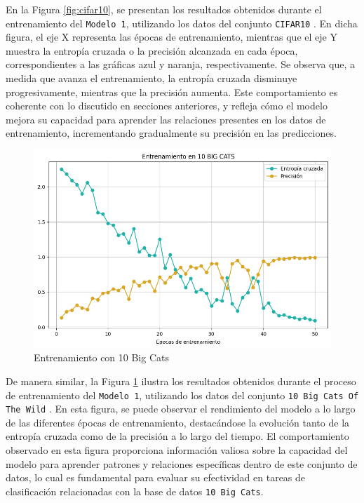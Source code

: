 En la Figura \ref{fig:cifar10}, se presentan los resultados obtenidos durante el entrenamiento del \texttt{Modelo 1}, utilizando los datos del conjunto \texttt{CIFAR10} \cite{cifar10}. En dicha figura, el eje X representa las épocas de entrenamiento, mientras que el eje Y muestra la entropía cruzada o la precisión alcanzada en cada época, correspondientes a las gráficas azul y naranja, respectivamente. Se observa que, a medida que avanza el entrenamiento, la entropía cruzada disminuye progresivamente, mientras que la precisión aumenta. Este comportamiento es coherente con lo discutido en secciones anteriores, y refleja cómo el modelo mejora su capacidad para aprender las relaciones presentes en los datos de entrenamiento, incrementando gradualmente su precisión en las predicciones. 

\begin{figure}[H]
	\centering
	\includegraphics[scale=0.5]{imagenes/10_big_cats.png}  
	\caption{Entrenamiento con 10 Big Cats}
	\label{fig:10_big_cats}
\end{figure}

De manera similar, la Figura \ref{fig:10_big_cats} ilustra los resultados obtenidos durante el proceso de entrenamiento del \texttt{Modelo 1}, utilizando los datos del conjunto \texttt{10 Big Cats Of The Wild} \cite{10_big_cats}. En esta figura, se puede observar el rendimiento del modelo a lo largo de las diferentes épocas de entrenamiento, destacándose la evolución tanto de la entropía cruzada como de la precisión a lo largo del tiempo. El comportamiento observado en esta figura proporciona información valiosa sobre la capacidad del modelo para aprender patrones y relaciones específicas dentro de este conjunto de datos, lo cual es fundamental para evaluar su efectividad en tareas de clasificación relacionadas con la base de datos \texttt{10 Big Cats}.

